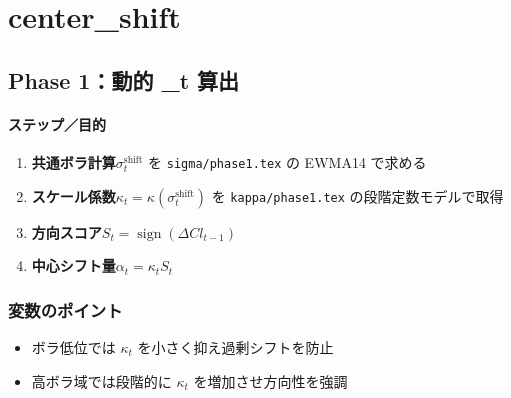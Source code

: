 
\section*{center\_shift}\nopagebreak[4]

\subsection*{Phase 1：動的 \alpha_t 算出}\nopagebreak[4]
\paragraph{ステップ／目的}
\begin{flushleft}
\begin{enumerate}
  \item \textbf{共通ボラ計算}\;\(\sigma_t^{\text{shift}}\) を
        {\scriptsize\verb|sigma/phase1.tex|} の EWMA14 で求める
  \item \textbf{スケール係数}\;\(\kappa_t=\kappa(\sigma_t^{\text{shift}})\) を
        {\scriptsize\verb|kappa/phase1.tex|} の段階定数モデルで取得
  \item \textbf{方向スコア}\;\(S_t=\operatorname{sign}(\Delta Cl_{t-1})\)
  \item \textbf{中心シフト量}\;\(\alpha_t=\kappa_t S_t\)
\end{enumerate}
\end{flushleft}

\subsubsection*{変数のポイント}
\begin{flushleft}
\begin{itemize}
  \item ボラ低位では \(\kappa_t\) を小さく抑え過剰シフトを防止
  \item 高ボラ域では段階的に \(\kappa_t\) を増加させ方向性を強調
\end{itemize}
\end{flushleft}

